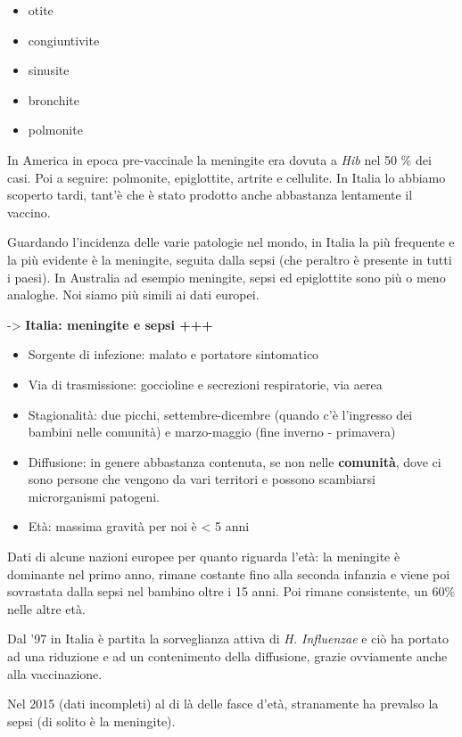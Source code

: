 \begin{itemize}
\item
  otite
\item
  congiuntivite
\item
  sinusite
\item
  bronchite
\item
  polmonite
\end{itemize}

  In America in epoca pre-vaccinale la meningite era dovuta a \emph{Hib}
  nel 50 \% dei casi. Poi a seguire: polmonite, epiglottite, artrite e
  cellulite. In Italia lo abbiamo scoperto tardi, tant'è che è stato
  prodotto anche abbastanza lentamente il vaccino.

  Guardando l'incidenza delle varie patologie nel mondo, in Italia la
  più frequente e la più evidente è la meningite, seguita dalla sepsi
  (che peraltro è presente in tutti i paesi). In Australia ad esempio
  meningite, sepsi ed epiglottite sono più o meno analoghe. Noi siamo
  più simili ai dati europei.

  -> \textbf{Italia: meningite e sepsi +++}
\begin{itemize}
\item Sorgente di infezione: malato e portatore sintomatico
\item Via di trasmissione: goccioline e secrezioni respiratorie, via aerea
\item Stagionalità: due picchi, settembre-dicembre (quando c'è l'ingresso
  dei bambini nelle comunità) e marzo-maggio (fine inverno - primavera)
\item Diffusione: in genere abbastanza contenuta, se non nelle
  \textbf{comunità}, dove ci sono persone che vengono da vari territori
  e possono scambiarsi microrganismi patogeni.
\item Età: massima gravità per noi è \textless{} 5 anni
\end{itemize}
  Dati di alcune nazioni europee per quanto riguarda l'età: la meningite
  è dominante nel primo anno, rimane costante fino alla seconda infanzia
  e viene poi sovrastata dalla sepsi nel bambino oltre i 15 anni. Poi
  rimane consistente, un 60\% nelle altre età.

  Dal '97 in Italia è partita la sorveglianza attiva di \emph{H.
  Influenzae} e ciò ha portato ad una riduzione e ad un contenimento
  della diffusione, grazie ovviamente anche alla vaccinazione.

  Nel 2015 (dati incompleti) al di là delle fasce d'età, stranamente ha
  prevalso la sepsi (di solito è la meningite).


